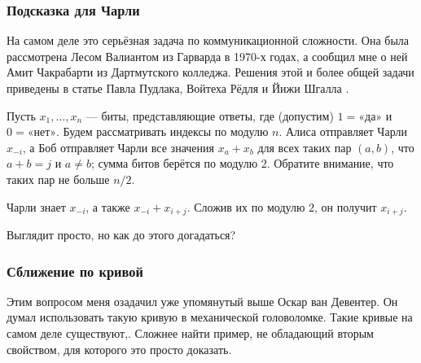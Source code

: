\begin{addedbytheeditors}
\pr
%
%
\end{addedbytheeditors}

\subsubsection*{Подсказка для Чарли}

На самом деле это серьёзная задача по коммуникационной сложности.
Она была рассмотрена Лесом Валиантом из Гарварда в 1970-х годах,
а сообщил мне о ней Амит Чакрабарти из Дартмутского колледжа.
Решения этой и более общей задачи приведены в статье Павла Пудлака, Войтеха Рёдля и Йижи Шгалла \cite{49}.

Пусть $x_1, \dots , x_n$ --- биты, представляющие ответы, где (допустим) $1 = \text{«да»}$ и $0 = \text{«нет»}$.
Будем рассматривать индексы по модулю $n$.
Алиса отправляет Чарли $x_{-i}$,
а Боб отправляет Чарли все значения $x_a + x_b$ для всех таких пар $(a, b)$, что $a + b = j$ и $a\ne b$;
сумма битов берётся по модулю $2$.
Обратите внимание, что таких пар не больше $n/2$.

Чарли знает $x_{-i}$, а также $x_{-i} + x_{i+j}$. Сложив их по модулю $2$, он получит $x_{i+j}$.

Выглядит просто, но как до этого догадаться?


\subsubsection*{Сближение по кривой}

Этим вопросом меня озадачил уже упомянутый выше Оскар ван Девентер.
Он думал использовать такую кривую в механической головоломке.
Такие кривые на самом деле существуют,.
Сложнее найти пример, не обладающий вторым свойством, для которого это просто доказать.

